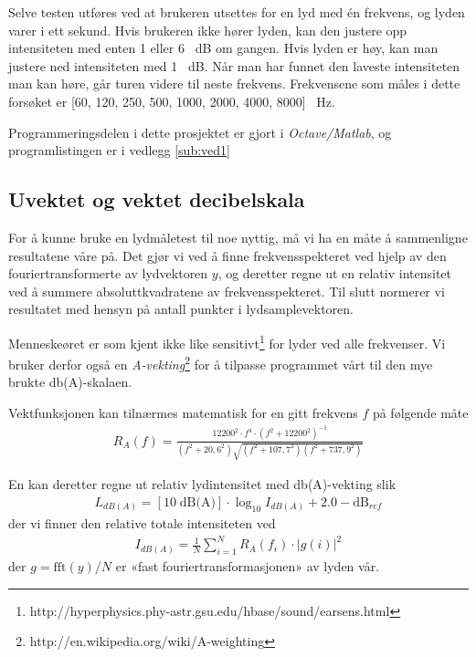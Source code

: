 \documentclass[norsk, twocolumn,letterpaper,11pt,fleqn]{extarticle}
\newcommand{\eq}[1]{{\small\begin{align*}#1\end{align*}}}
\newcommand{\equ}[1]{{\small\begin{align}#1\end{align}}}
\begin{document}
Selve testen utføres ved at brukeren utsettes for en lyd med én frekvens,
og lyden varer i ett sekund. Hvis brukeren ikke hører lyden, kan den justere opp
intensiteten med enten \num{1} eller \num{6} \SI{}{\dB} om gangen.
Hvis lyden er høy,
kan man justere ned intensiteten med \num{1} \SI{}{\dB}.
Når man har funnet den laveste intensiteten man kan høre, 
går turen videre til neste frekvens. Frekvensene som måles i dette forsøket er
[\num{60}, \num{120}, \num{250}, \num{500}, 
\num{1000}, \num{2000}, \num{4000}, \num{8000}] \SI{}{\Hz}.

Programmeringsdelen i dette prosjektet er gjort i \textit{Octave/Matlab},
og programlistingen er i vedlegg \ref{sub:ved1}

\subsection{Uvektet og vektet decibelskala}
\label{sub:dba}
For å kunne bruke en lydmåletest til noe nyttig, 
må vi ha en måte å sammenligne resultatene våre på.
Det gjør vi ved å finne frekvensspekteret ved hjelp av den fouriertransformerte 
av lydvektoren $y$,
og deretter regne ut en relativ intensitet ved å summere absoluttkvadratene av
frekvensspekteret. Til slutt normerer vi resultatet med hensyn 
på antall punkter i lydsamplevektoren.

Menneskeøret er som kjent ikke like 
sensitivt\footnote[3]{http://hyperphysics.phy-astr.gsu.edu/hbase/sound/earsens.html} 
for lyder ved alle frekvenser.
Vi bruker derfor også en 
\textit{A-vekting}\footnote[4]{http://en.wikipedia.org/wiki/A-weighting} for å
tilpasse programmet vårt til den mye brukte db(A)-skalaen.

Vektfunksjonen kan tilnærmes matematisk for en gitt frekvens $f$ på følgende måte
\eq{
	R_A(f) = \frac{12200^2\cdot f^4 \cdot (f^2+12200^2)^{-1}}
	{(f^2 +20{,}6^2)\sqrt{(f^2+107{,}7^2)(f^2+737{,}9^2)}}
}

En kan deretter regne ut relativ lydintensitet med db(A)-vekting slik
\equ{
	L_{dB(A)} = [10\;\text{dB(A)}]\cdot \log_{10} I_{dB(A)} + 2.0 - \text{dB}_{ref}
}
der vi finner den relative totale intensiteten ved
\equ{
	I_{dB(A)} = \frac{1}{N}\sum_{i=1}^N R_A(f_i)\cdot |g(i)|^2
}
der $g = \text{fft}(y)/N$ er «fast fouriertransformasjonen» av lyden vår.
\end{document}
